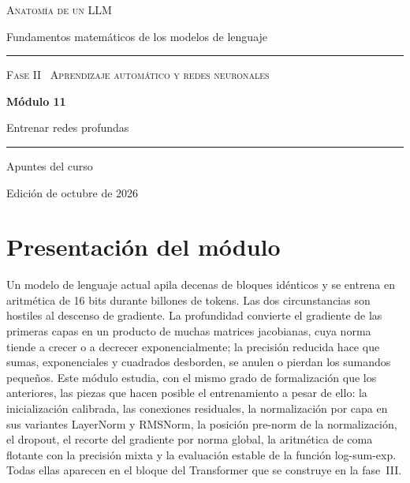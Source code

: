 \documentclass[11pt,a4paper,twoside,openany]{book}
\begin{document}
\frontmatter
\begin{titlepage}
\centering
\vspace*{2.5cm}
{\large\scshape Anatomía de un LLM}\par
\vspace{0.4cm}
{\normalsize Fundamentos matemáticos de los modelos de lenguaje}\par
\vspace{2.2cm}
\rule{\textwidth}{0.8pt}\par\vspace{0.5cm}
{\small\scshape Fase II \textperiodcentered\ Aprendizaje automático y redes neuronales}\par\vspace{0.3cm}
{\Huge\bfseries Módulo 11\par}\vspace{0.3cm}
{\LARGE Entrenar redes profundas\par}
\vspace{0.5cm}\rule{\textwidth}{0.4pt}\par
\vspace{1.6cm}
{\large Apuntes del curso}\par
\vfill
{\small Edición de octubre de 2026}\par
\end{titlepage}

\chapter*{Presentación del módulo}

Un modelo de lenguaje actual apila decenas de bloques idénticos y se entrena en aritmética de 16 bits durante billones de tokens. Las dos circunstancias son hostiles al descenso de gradiente. La profundidad convierte el gradiente de las primeras capas en un producto de muchas matrices jacobianas, cuya norma tiende a crecer o a decrecer exponencialmente; la precisión reducida hace que sumas, exponenciales y cuadrados desborden, se anulen o pierdan los sumandos pequeños. Este módulo estudia, con el mismo grado de formalización que los anteriores, las piezas que hacen posible el entrenamiento a pesar de ello: la inicialización calibrada, las conexiones residuales, la normalización por capa en sus variantes LayerNorm y RMSNorm, la posición pre-norm de la normalización, el dropout, el recorte del gradiente por norma global, la aritmética de coma flotante con la precisión mixta y la evaluación estable de la función log-sum-exp. Todas ellas aparecen en el bloque del Transformer que se construye en la fase~III.
\end{document}
